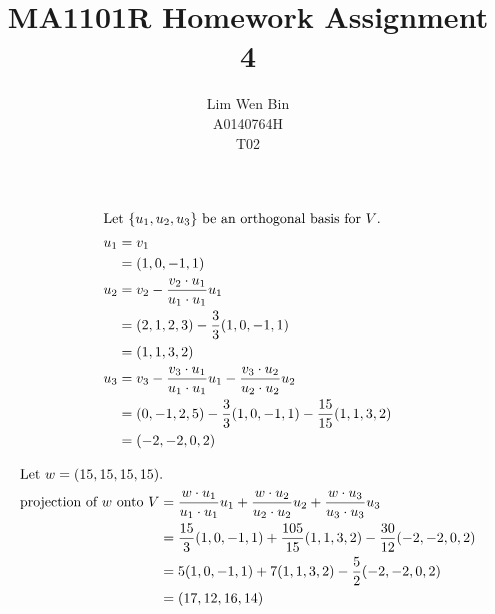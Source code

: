 \documentclass[12pt]{article}
\newenvironment{problem}[2][Problem]{\begin{trivlist}
\item[\hskip \labelsep {\bfseries #1}\hskip \labelsep {\bfseries #2.}]}{\end{trivlist}}
\begin{document}
\title{MA1101R Homework Assignment 4}
\author{Lim Wen Bin \\
A0140764H\\
T02}
\maketitle

\begin{problem}{1.i}
\end{problem}
\begin{align*}
\intertext{Let $\{u_1, u_2, u_3\}$ be an orthogonal basis for $V$.}
u_1 &= v_1\\
&= (1, 0, -1, 1)\\
u_2 &= v_2 - \frac{v_2 \cdot u_1}{u_1 \cdot u_1}u_1\\
&= (2, 1, 2, 3) - \frac{3}{3} (1, 0, -1, 1)\\
&= (1, 1, 3, 2)\\
u_3 &= v_3 - \frac{v_3 \cdot u_1}{u_1 \cdot u_1}u_1 - \frac{v_3 \cdot u_2}{u_2 \cdot u_2}u_2\\ 
&= (0, -1, 2, 5) - \frac{3}{3} (1, 0, -1, 1) - \frac{15}{15} (1, 1, 3, 2)\\
&= (-2, -2, 0, 2) \\
\end{align*}
\filbreak

\begin{problem}{1.ii}
\end{problem}
\begin{align*}
\intertext{Let $w = (15, 15, 15, 15)$.}
\text{projection of $w$ onto $V$} &= \frac{w \cdot u_1}{u_1 \cdot u_1}u_1 + \frac{w \cdot u_2}{u_2 \cdot u_2}u_2 + \frac{w \cdot u_3}{u_3 \cdot u_3}u_3 \\
&= \frac{15}{3} (1, 0, -1, 1) + \frac{105}{15} (1, 1, 3, 2) - \frac{30}{12} (-2, -2, 0, 2)\\
&= 5 (1, 0, -1, 1) + 7 (1, 1, 3, 2) - \frac{5}{2} (-2, -2, 0, 2)\\
&= (17, 12, 16, 14)
\end{align*}
\filbreak
\end{document}
